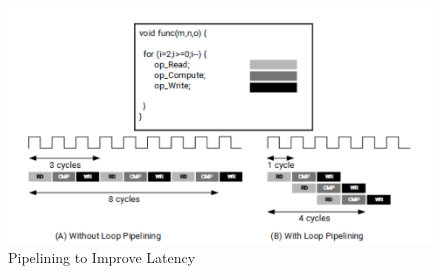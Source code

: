 \begin{figure}[H]
\begin{center}
    \includegraphics[width=0.9\linewidth]{chapters/chapter3/img/pipeline.png}
    \caption{Pipelining to Improve Latency}
    \label{fig:pipeline}
\end{center}
\end{figure}
